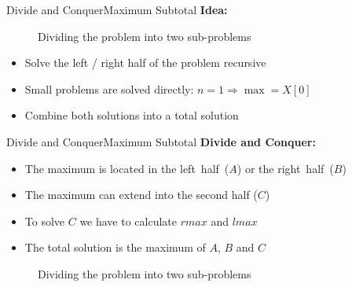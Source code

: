 
\begin{frame}{Divide and Conquer}{Maximum Subtotal}
  \textbf{Idea:}
  \begin{figure}
    \begin{adjustbox}{width=\linewidth}
      
    \end{adjustbox}
    \caption{Dividing the problem into two sub-problems}
    \label{fig:divide_and_conquer:max_sub_total_divide}
  \end{figure}
  \begin{itemize}
    \item<2->
      Solve the left / right half of the problem {\color{Mittel-Blau}recursive}
    \item<3->
      Small problems are solved directly: $n = 1 \Rightarrow \max = X[0]$
    \item<4->
      Combine both solutions into a total solution
  \end{itemize}
\end{frame}


\begin{frame}{Divide and Conquer}{Maximum Subtotal}
  \textbf{Divide and Conquer:}
  \begin{itemize}
    \item
      The maximum is located in the {\color{Mittel-Blau}left~half~($A$)}
      or the {\color{Mittel-Blau}right~half~($B$)}
    \item
      The maximum can {\color{Mittel-Blau}extend into the second half ($C$)}
    \item
      To solve $C$ we have to calculate $rmax$ and $lmax$
    \item
      The total solution is the {\color{Mittel-Blau}maximum of $A$, $B$ and $C$}
  \end{itemize}
  \begin{figure}
    \begin{adjustbox}{width=\linewidth}
      
    \end{adjustbox}
    \caption{Dividing the problem into two sub-problems}
    \label{fig:divide_and_conquer:max_sub_total_divide2}
  \end{figure}
\end{frame}

